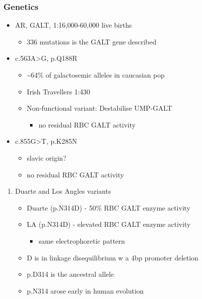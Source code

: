 \documentclass{scrartcl}
\begin{document}
\subsubsection{Genetics}
\label{sec:org8e1b976}
\begin{itemize}
\item AR, GALT, 1:16,000-60,000 live births
\begin{itemize}
\item 336 mutations is the GALT gene described
\end{itemize}
\item c.563A>G, p.Q188R
\begin{itemize}
\item \textasciitilde{}64\% of galactosemic alleles in caucasian pop
\item Irish Travellers 1:430
\item Non-functional variant: Destabilise UMP-GALT
\begin{itemize}
\item no residual RBC GALT activity
\end{itemize}
\end{itemize}
\item c.855G>T, p.K285N
\begin{itemize}
\item slavic origin?
\item no residual RBC GALT activity
\end{itemize}
\end{itemize}
\begin{enumerate}
\item Duarte and Los Angles variants
\label{sec:orga4bffc6}
\begin{itemize}
\item Duarte (p.N314D) - 50\% RBC GALT enzyme activity
\item LA (p.N314D) - elevated RBC GALT enzyme activity
\begin{itemize}
\item same electrophoretic pattern
\end{itemize}
\item D is in linkage disequilibrium w a 4bp promoter deletion
\item p.D314 is the ancestral allele
\item p.N314 arose early in human evolution
\end{itemize}
\end{enumerate}
\end{document}

